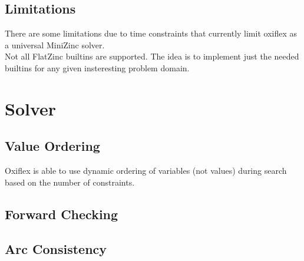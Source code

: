 \subsection{Limitations}

There are some limitations due to time constraints that currently limit oxiflex as a universal MiniZinc solver. \\

Not all FlatZinc builtins are supported. The idea is to implement just the needed builtins for any given insteresting problem domain.

\section{Solver}

\subsection{Value Ordering}

Oxiflex is able to use dynamic ordering of variables (not values) during search based on the number of constraints.

\subsection{Forward Checking}

\subsection{Arc Consistency}

